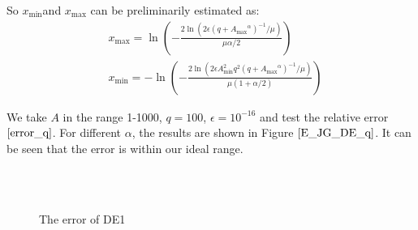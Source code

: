 So  $x_{\min}$and $x_{\max}$ can be preliminarily estimated as:
\begin{equation}
	\begin{aligned}
		&x_{\max}=\ln\left(-\frac{2\ln(2\epsilon  (q+{A_{\max}}^{\alpha})^{-1}/\mu)}{\mu \alpha/2}\right)\\
		&x_{\min}=-\ln\left(-\frac{2\ln(2\epsilon A^2_{\min} q^2  (q+{A_{\max}}^{\alpha})^{-1}/\mu)}{\mu(1+\alpha/2)}\right)
	\end{aligned}
	\label{findminmax_DE1_q}
\end{equation}

We take $A$ in the range 1-1000, $q=100$, $\epsilon=10^{-16}$ and test the relative error $\eqref{error_q}$. For different $\alpha $, the results are shown in  Figure $\ref{E_JG_DE_q}$. It can be seen that the error is within our ideal range.
\begin{figure}[htbp]
	\centering
	~~
	~~
	\\
	~~
	~~
	\caption{The error of DE1}
	\label{E_JG_DE_q}
\end{figure}

